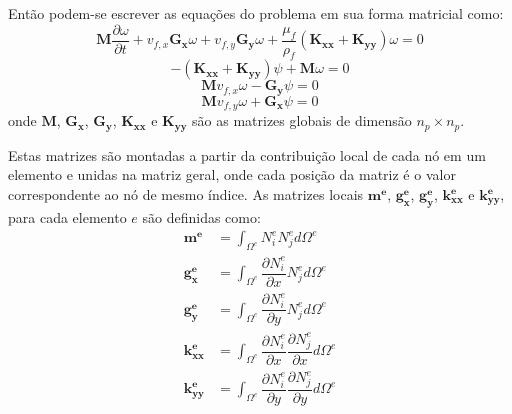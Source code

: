 Então podem-se escrever as equações do problema em sua forma matricial como:
\begin{equation}
    \mathbf{M}
    \dfrac{\partial \omega}{\partial t} +
    v_{f,x}
    \mathbf{G_x}
    \omega +
    v_{f,y}
    \mathbf{G_y}
    \omega +
    \dfrac{\mu_f}{\rho_f}
    \left(
    \mathbf{K_{xx}} +
    \mathbf{K_{yy}}
    \right)
    \omega = 0
    \label{last_dt}
\end{equation}
\begin{equation}
    -\left(
    \mathbf{K_{xx}} +
    \mathbf{K_{yy}}
    \right)
    \psi +
    \mathbf{M}
    \omega = 0
\end{equation}
\begin{equation}
    \mathbf{M}
    v_{f,x}
    \omega -
    \mathbf{G_y}
    \psi = 0
\end{equation}
\begin{equation}
    \mathbf{M}
    v_{f,y}
    \omega +
    \mathbf{G_x}
    \psi = 0
\end{equation}
onde $\mathbf{M}$, $\mathbf{G_{x}}$, $\mathbf{G_{y}}$, $\mathbf{K_{xx}}$ e $\mathbf{K_{yy}}$ são as matrizes globais de dimensão $n_p \times n_p$.

Estas matrizes são montadas a partir da contribuição local de cada nó em um elemento e unidas na matriz geral, onde cada posição da matriz é o valor correspondente ao nó de mesmo índice.
As matrizes locais $\mathbf{m^e}$, $\mathbf{g_{x}^e}$, $\mathbf{g_{y}^e}$, $\mathbf{k_{xx}^e}$ e $\mathbf{k_{yy}^e}$, para cada elemento $e$ são definidas como:
\begin{align}
    \mathbf{m^e} &=
    \int_{\Omega^e}
    N_i^e N_j^e
    d\Omega^e \\
    \mathbf{g_x^e} &=
    \int_{\Omega^e}
    \dfrac{\partial N_i^e}{\partial x}
    N_j^e
    d\Omega^e \\
    \mathbf{g_y^e} &=
    \int_{\Omega^e}
    \dfrac{\partial N_i^e}{\partial y}
    N_j^e
    d\Omega^e \\
    \mathbf{k_{xx}^e} &=
    \int_{\Omega^e}
    \dfrac{\partial N_i^e}{\partial x}
    \dfrac{\partial N_j^e}{\partial x}
    d\Omega^e \\
    \mathbf{k_{yy}^e} &=
    \int_{\Omega^e}
    \dfrac{\partial N_i^e}{\partial y}
    \dfrac{\partial N_j^e}{\partial y}
    d\Omega^e
\end{align}

